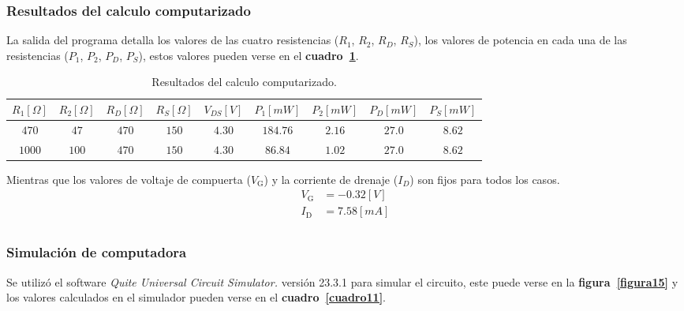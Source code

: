 \subsubsection{Resultados del calculo computarizado}
La salida del programa detalla los valores de las cuatro resistencias ($R_1$,
$R_2$, $R_D$, $R_S$), los valores de potencia en cada una de las resistencias
($P_1$, $P_2$, $P_D$, $P_S$), estos valores pueden verse en el
\textbf{cuadro~\ref{cuadro10}}.

\begin{table}[!h]
\begin{center}
    \begin{tabular}{|c|c|c|c||c||c|c|c|c|}
    \hline
    $R_1[\Omega]$ & $R_2[\Omega]$ & $R_D[\Omega]$ & $R_S[\Omega]$ &
    $V_{DS}[V]$ &
    $P_1[mW]$ & $P_2[mW]$ & $P_D[mW]$ & $P_S[mW]$
    \tabularnewline \hline \hline
    $ 470$ & $ 47$ & $470$ & $150$ & $4.30$ & $184.76$ & $2.16$ & $27.0$ & $8.62$ \tabularnewline \hline
    $1000$ & $100$ & $470$ & $150$ & $4.30$ & $ 86.84$ & $1.02$ & $27.0$ & $8.62$ \tabularnewline \hline
    \end{tabular}
\end{center}
\caption{Resultados del calculo computarizado.}
\label{cuadro10}
\end{table}

Mientras que los valores de voltaje de compuerta ($V_{\text{G}}$) y la corriente
de drenaje ($I_D$) son fijos para todos los casos.
\begin{equation*}
    \begin{split}
        V_{\text{G}} &= -0.32[V]\\
        I_{\text{D}} &= 7.58[mA]\\
    \end{split}
\end{equation*}

\subsubsection{Simulación de computadora}
Se utilizó el software \emph{Quite Universal Circuit Simulator.} versión 23.3.1
para simular el circuito, este puede verse en la
\textbf{figura~\ref{figura15}} y los valores calculados en el simulador pueden
verse en el \textbf{cuadro~\ref{cuadro11}}.


